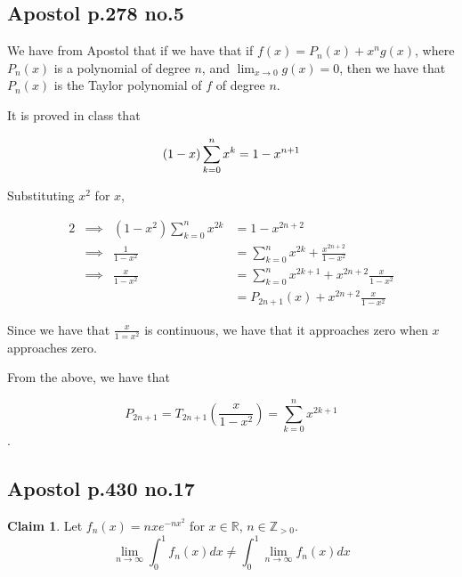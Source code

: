 \documentclass[12pt,letterpaper]{article}
\theoremstyle{definition}
\newtheorem*{claim}{Claim}
\newcommand{\R}{\mathbb{R}}
\newcommand{\Zg}{\mathbb{Z}_{>0}}
\begin{document}
\subsection*{Apostol p.278 no.5}

We have from Apostol that if we have that if $f(x) = P_n(x) + x^ng(x)$, where
$P_n(x)$ is a polynomial of degree $n$, and $\lim_{x\rightarrow 0}g(x) = 0$,
then we have that $P_n(x)$ is the Taylor polynomial of $f$ of degree $n$.

It is proved in class that

\[
  (1-x)\sum_{k=0}^nx^k = 1 - x^{n+1} \\
\]

Substituting $x^2$ for $x$,

\begin{alignat*}{2}
  &\implies& (1-x^2)\sum_{k=0}^nx^{2k} &= 1 - x^{2n+2} \\
  &\implies& \frac{1}{1-x^2} &= \sum_{k=0}^nx^{2k} + \frac{x^{2n+2}}{1-x^2} \\
  &\implies& \frac{x}{1-x^2} &= \sum_{k=0}^nx^{2k+1} + x^{2n+2}\frac{x}{1-x^2}
  \\
  &&&= P_{2n+1}(x) + x^{2n+2}\frac{x}{1-x^2}
\end{alignat*}

Since we have that $\frac{x}{1=x^2}$ is continuous, we have that it approaches
zero when $x$ approaches zero.

From the above, we have that

\[P_{2n+1} = T_{2n+1}(\frac{x}{1-x^2}) = \sum_{k=0}^nx^{2k+1} \].


\subsection*{Apostol p.430 no.17}

\begin{claim}
  Let $f_n(x) = nxe^{-nx^2}$ for $x \in \R$, $n \in \Zg$.
  \[
    \lim_{n\rightarrow \infty}\int_0^1f_n(x)dx \neq \int_0^1\lim_{n\rightarrow \infty}f_n(x)dx
  \]
\end{claim}
\end{document}
